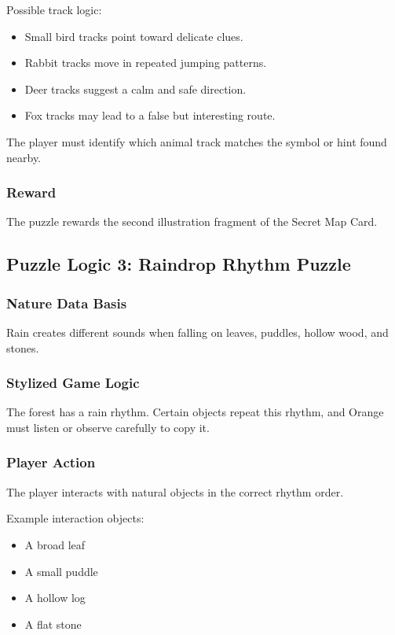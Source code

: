 \documentclass[12pt]{article}
\begin{document}
Possible track logic:

\begin{itemize}[leftmargin=*]
    \item Small bird tracks point toward delicate clues.
    \item Rabbit tracks move in repeated jumping patterns.
    \item Deer tracks suggest a calm and safe direction.
    \item Fox tracks may lead to a false but interesting route.
\end{itemize}

The player must identify which animal track matches the symbol or hint found nearby.

\subsubsection{Reward}

The puzzle rewards the second illustration fragment of the Secret Map Card.

\subsection{Puzzle Logic 3: Raindrop Rhythm Puzzle}

\subsubsection{Nature Data Basis}

Rain creates different sounds when falling on leaves, puddles, hollow wood, and stones.

\subsubsection{Stylized Game Logic}

The forest has a rain rhythm. Certain objects repeat this rhythm, and Orange must listen or observe carefully to copy it.

\subsubsection{Player Action}

The player interacts with natural objects in the correct rhythm order.

Example interaction objects:

\begin{itemize}[leftmargin=*]
    \item A broad leaf
    \item A small puddle
    \item A hollow log
    \item A flat stone
\end{itemize}
\end{document}
